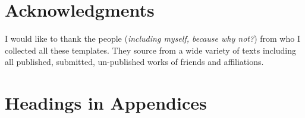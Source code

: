 \documentclass{sig-alternate-05-2015}
\begin{document}
\section{Acknowledgments}
I would like to thank the people (\textit{including myself, because why not?}) from who I collected all these templates. They source from a wide variety of texts including all published, submitted, un-published works of friends and affiliations. 


\appendix

\section{Headings in Appendices}
\end{document}
